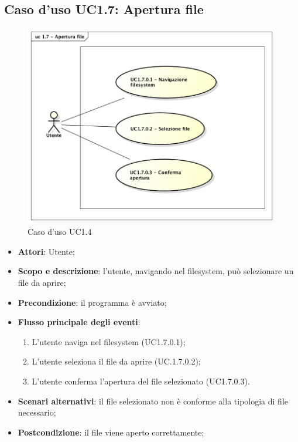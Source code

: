 \subsection{Caso d'uso UC1.7: Apertura file}

\begin{figure}[htbp]
\centering
\includegraphics[scale=0.5]{UseCase_17_03_2016/immagini/uc_1_7_apertura_file.png}
\captionsetup{labelfont=bf}
\caption{Caso d'uso UC1.4}
\end{figure}

\begin{itemize}
\item \textbf{Attori}: Utente;
\item \textbf{Scopo e descrizione}: l'utente, navigando nel filesystem, può selezionare un file da aprire;
\item \textbf{Precondizione}: il programma è avviato;
\item \textbf{Flusso principale degli eventi}:
\begin{enumerate}
\item L'utente naviga nel filesystem (UC1.7.0.1);
\item L'utente seleziona il file da aprire (UC.1.7.0.2);
\item L'utente conferma l'apertura del file selezionato (UC1.7.0.3).
\end{enumerate}
\item \textbf{Scenari alternativi}: il file selezionato non è conforme alla tipologia di file necessario;
\item \textbf{Postcondizione}: il file viene aperto correttamente;
\end{itemize}


